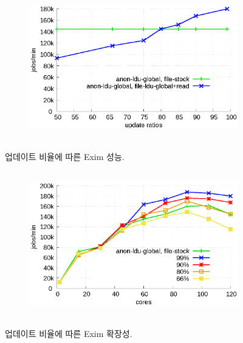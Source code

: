 \begin{figure}[t!]
    \centering
    \begin{subfigure}[b]{1\textwidth}
  \begin{center}
        \includegraphics[height=2.5in]{graph/ratio_exim.eps}
  \end{center}
    \end{subfigure}%
    \caption{업데이트 비율에 따른 Exim 성능.}
    \label{fig:UpdateRate_exim}
\end{figure}

\begin{figure}[t!]
    \centering
    \begin{subfigure}[b]{1\textwidth}
        \includegraphics[height=2.5in]{graph/ratio_exim_core.eps}
    \end{subfigure}%
    \caption{업데이트 비율에 따른 Exim 확장성.}
    \label{fig:UpdateRate_exim_2}
\end{figure}

